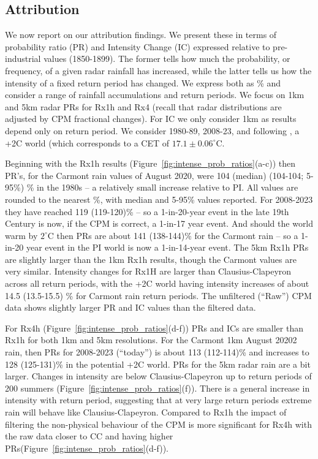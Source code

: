 \documentclass[11pt,a4paper]{article}
\begin{document}
\subsection{Attribution}
\label{subsect:attribution}
We now report on our attribution findings. We present these in terms of probability ratio (PR) and  Intensity Change (IC) expressed relative to pre-industrial values (1850-1899). The former tells how much the probability, or frequency, of a given radar rainfall has increased, while the latter tells us how the intensity of a fixed  return period has changed. We express both as \% and consider a range of rainfall accumulations and return periods. We focus on 1km and 5km radar PRs for Rx1h and Rx4 (recall that radar distributions are adjusted by CPM fractional changes).  For IC we only consider 1km as results depend only on return period.  We consider 1980-89, 2008-23, and following \cite{tett2023edinburgh}, a +2C world (which corresponds to a CET of $17.1 \pm 0.06 ^\circ$C.  

Beginning with the Rx1h results (Figure~\ref{fig:intense_prob_ratios}(a-c)) then PR's, for the Carmont rain values of August 2020,  were 104 (median) (104-104; 5-95\%) \% in the 1980s -- a relatively small increase relative to PI. All values are rounded to the nearest \%, with median and 5-95\% values reported. For 2008-2023 they have reached  119 (119-120)\% -- so a 1-in-20-year event in the late 19th Century is now, if the CPM is correct, a 1-in-17 year event.  And should the world warm by $2^\circ$C then PRs are about 141 (138-144)\% for the Carmont rain -- so a 1-in-20 year event in the PI world is now a 1-in-14-year event. The 5km Rx1h PRs are slightly larger than the 1km Rx1h results, though the Carmont values are very similar. Intensity changes for Rx1H are larger than Clausius-Clapeyron across all return periods, with the +2C world having intensity increases of about 14.5 (13.5-15.5) \% for Carmont rain return periods. The unfiltered (``Raw'') CPM data  shows slightly larger PR and IC values than the filtered data.

For Rx4h  (Figure~\ref{fig:intense_prob_ratios}(d-f)) PRs and ICs are smaller than  Rx1h for both 1km and 5km resolutions. For the Carmont 1km  August 20202 rain, then PRs for 2008-2023 (``today'') is about  113 (112-114)\% and increases to 128 (125-131)\% in the potential +2C world. PRs for the 5km radar rain are a bit larger.  Changes in intensity are below Clausius-Clapeyron  up to return periods of 200 summers  (Figure~\ref{fig:intense_prob_ratios}(f)).  There is a general increase in intensity with return period, suggesting that at very large return periods extreme rain will behave like   Clausius-Clapeyron. Compared to Rx1h the impact of filtering the non-physical behaviour of the CPM is more significant for Rx4h  with the raw data closer to  CC  and having higher PRs(Figure~\ref{fig:intense_prob_ratios}(d-f)). 
\end{document}

